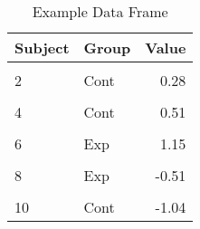 \begin{table}[h]
\centering
\begin{tabular}{llr}
\toprule
Subject & Group & Value\\
\midrule
\cellcolor{gray!10}{1} & \cellcolor{gray!10}{Exp} & \cellcolor{gray!10}{-0.36}\\
2 & Cont & 0.28\\
\cellcolor{gray!10}{3} & \cellcolor{gray!10}{Exp} & \cellcolor{gray!10}{1.54}\\
4 & Cont & 0.51\\
\cellcolor{gray!10}{5} & \cellcolor{gray!10}{Exp} & \cellcolor{gray!10}{-1.28}\\
6 & Exp & 1.15\\
\cellcolor{gray!10}{7} & \cellcolor{gray!10}{Cont} & \cellcolor{gray!10}{3.78}\\
8 & Exp & -0.51\\
\cellcolor{gray!10}{9} & \cellcolor{gray!10}{Cont} & \cellcolor{gray!10}{NA}\\
10 & Cont & -1.04\\
\bottomrule
\end{tabular}
\caption{Example Data Frame}
\label{tab:data_frame_ex}
\end{table}